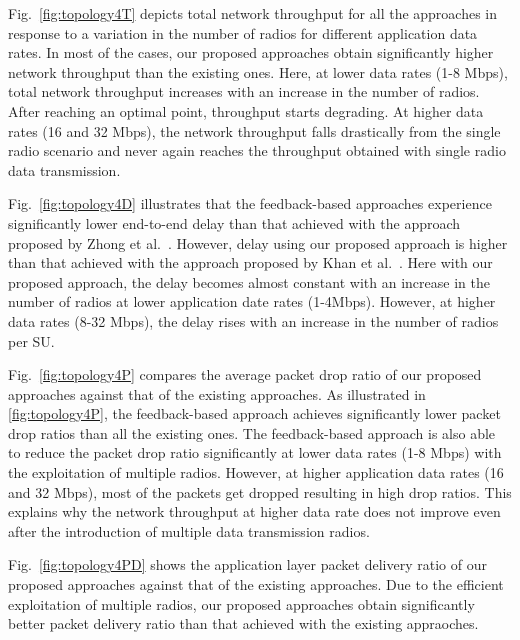 Fig.~\ref{fig:topology4T} depicts total network throughput for all the approaches in response to a variation in the number of radios for different application data rates. In most of the cases, our proposed approaches obtain significantly higher network throughput than the existing ones. Here, at lower data rates (1-8 Mbps), total network throughput increases with an increase in the number of radios. After reaching an optimal point, throughput starts degrading. At higher data rates (16 and 32 Mbps), the network throughput falls drastically from the single radio scenario and never again reaches the throughput obtained with single radio data transmission.

Fig.~\ref{fig:topology4D} illustrates that the feedback-based approaches experience significantly lower end-to-end delay than that achieved with the approach proposed by Zhong et al.~\cite{zhong2014capacity}. However, delay using our proposed approach is higher than that achieved with the approach proposed by Khan et al.~\cite{khan2015towards}. Here with our proposed approach, the delay becomes almost constant with an increase in the number of radios at lower application date rates (1-4Mbps). However, at higher data rates (8-32 Mbps), the delay rises with an increase in the number of radios per SU.

Fig.~\ref{fig:topology4P} compares the average packet drop ratio of our proposed approaches against that of the existing approaches.  As illustrated in \cref{fig:topology4P}, the feedback-based approach achieves significantly lower packet drop ratios than all the existing ones. The feedback-based approach is also able to reduce the packet drop ratio significantly at lower data rates (1-8 Mbps) with the exploitation of multiple radios. However, at higher application data rates (16 and 32 Mbps), most of the packets get dropped resulting in high drop ratios. This explains why the network throughput at higher data rate does not improve even after the introduction of multiple data transmission radios.

Fig.~\ref{fig:topology4PD} shows the application layer packet delivery ratio of our proposed approaches against that of the existing approaches. Due to the efficient exploitation of multiple radios, our proposed approaches obtain significantly better packet delivery ratio than that achieved with the existing appraoches.

